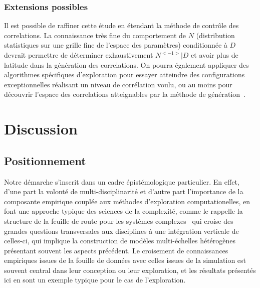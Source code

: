 \subsubsection{Extensions possibles}

Il est possible de raffiner cette étude en étendant la méthode de contrôle des correlations. La connaissance très fine du comportement de $N$ (distribution statistiques sur une grille fine de l'espace des paramètres) conditionnée à $D$ devrait permettre de déterminer exhaustivement $N^{<-1>} | D$ et avoir plus de latitude dans la génération des correlations. On pourra également appliquer des algorithmes spécifiques d'exploration pour essayer atteindre des configurations exceptionnelles réalisant un niveau de corrélation voulu, ou au moins pour découvrir l'espace des correlations atteignables par la méthode de génération~\cite{10.1371/journal.pone.0138212}.





\section{Discussion}



\subsection*{Positionnement}


Notre démarche s'inscrit dans un cadre épistémologique particulier. En effet, d'une part la volonté de multi-disciplinarité et d'autre part l'importance de la composante empirique couplée aux méthodes d'exploration computationelles, en font une approche typique des sciences de la complexité, comme le rappelle la structure de la feuille de route pour les systèmes complexes~\cite{chavalarias2013phylomemetic} qui croise des grandes questions transversales aux disciplines à une intégration verticale de celles-ci, qui implique la construction de modèles multi-échelles hétérogènes présentant souvent les aspects précédent. Le croisement de connaissances empiriques issues de la fouille de données avec celles issues de la simulation est souvent central dans leur conception ou leur exploration, et les résultats présentés ici en sont un exemple typique pour le cas de l'exploration.



